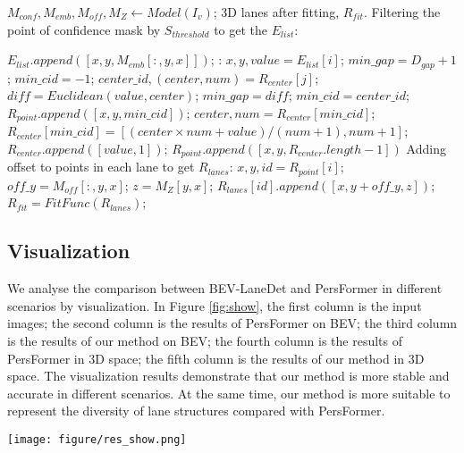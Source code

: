 \documentclass[10pt,twocolumn,letterpaper]{article}
\begin{document}
\renewcommand{\algorithmicrequire}{\textbf{Input:}}
\renewcommand{\algorithmicensure}{\textbf{Output:}}
\begin{algorithm}\footnotesize
\caption{Post-processing algorithm of our method}
\label{alg:Inference post-processing}
\begin{algorithmic}[1]\REQUIRE $M_{conf}, M_{emb}, M_{off}, M_{Z}\leftarrow Model(I_v)$;
\ENSURE 3D lanes after fitting, $R_{fit}$.
\STATE Filtering the point of confidence mask by $S_{threshold}$ to get the $E_{list}$:

\STATE $E_{list}.append([x, y, M_{emb}[:, y, x]])$;
\ENDIF
\ENDFOR
\ENDFOR
{}:
\STATE $x, y, value = E_{list}[i]$;
\STATE $min\_gap = D_{gap} + 1$;
\STATE $min\_cid = -1$;
\STATE $center\_id, (center, num) = R_{center}[j]$;
\STATE $diff = Euclidean(value, center)$;
\STATE $min\_gap = diff$;
\STATE $min\_cid = center\_id$;
\ENDIF
\ENDFOR
{}
\STATE $R_{point}.append([x, y, min\_cid])$;
\STATE $center, num = R_{center}[min\_cid]$;
\STATE $R_{center}[min\_cid] = [(center \times num + value) / (num + 1), num + 1]$;
\ELSE 
\STATE $R_{center}.append([value, 1])$;
\STATE $R_{point}.append([x, y, R_{center}.length - 1])$
\ENDIF
\ENDFOR
\STATE Adding offset to points in each lane to get $R_{lanes}$:
\STATE $x, y, id = R_{point}[i]$;
\STATE $off\_y = M_{off}[:, y, x]$;
\STATE $z = M_{Z}[y, x]$;
\STATE $R_{lanes}[id].append([x, y+off\_y, z])$;
\ENDFOR
\STATE $R_{fit} = FitFunc(R_{lanes})$;

\end{algorithmic}
\end{algorithm} 
\subsection{Visualization}
We analyse the comparison between BEV-LaneDet and PersFormer\cite{chen2022persformer} in different scenarios by visualization. In Figure \ref{fig:show}, the first column is the input images; the second column is the results of PersFormer on BEV; the third column is the results of our method on BEV; the fourth column is the results of PersFormer in 3D space; the fifth column is the results of our method in 3D space. The visualization results demonstrate that our method is more stable and accurate in different scenarios. At the same time, our method is more suitable to represent the diversity of lane structures compared with PersFormer.



\begin{figure*}[t]
    \centering
\texttt{[image: figure/res\_show.png]}
\caption{Qualitative results of PersFormer\cite{chen2022persformer} and BEV-LaneDet in different scenarios of the OpenLane dataset. First row: Curve; second row: Merge\&Split; third row: Up\&Down; fourth row: Night; fifth row: Intersection; sixth row: Backlight.}
    \label{fig:show}
\end{figure*}
\end{document}
